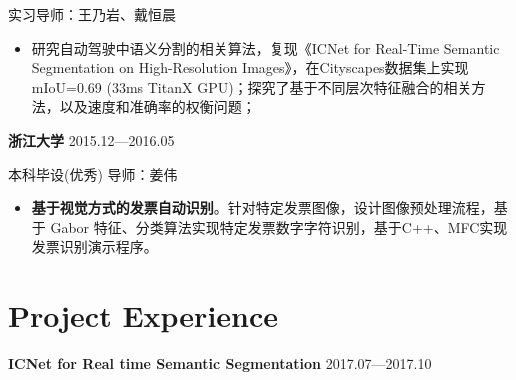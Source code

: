 \documentclass{article}
\begin{document}
\linespread{1.2}\selectfont %
\par 实习导师：王乃岩、戴恒晨
\begin{itemize}
\item 研究自动驾驶中语义分割的相关算法，复现《ICNet for Real-Time Semantic Segmentation on High-Resolution Images》，在Cityscapes数据集上实现mIoU=0.69 (33ms TitanX GPU)；探究了基于不同层次特征融合的相关方法，以及速度和准确率的权衡问题；
\end{itemize}



\par \large \textbf{浙江大学}  \hfill 2015.12—2016.05
\linespread{1.6}\selectfont %

\linespread{1.2}\selectfont %
\par 本科毕设(优秀)  \quad 导师：姜伟
\begin{itemize}
\item \textbf{基于视觉方式的发票自动识别}。针对特定发票图像，设计图像预处理流程，基于 Gabor 特征、分类算法实现特定发票数字字符识别，基于C++、MFC实现发票识别演示程序。
\end{itemize}




\section*{Project Experience}
\vspace{-1.3\baselineskip}
\noindent\hrulefill






\par \large \textbf{ICNet for Real time Semantic Segmentation}  \hfill 2017.07—2017.10
\linespread{1.6}\selectfont %
\end{document}

